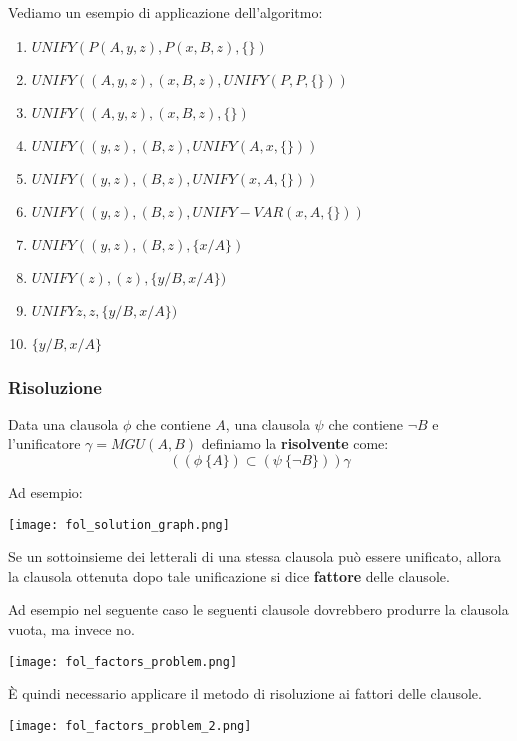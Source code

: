\begin{example}
	Vediamo un esempio di applicazione dell'algoritmo:
	\begin{enumerate}
		\item $UNIFY(P(A,y,z),P(x,B,z), \{\})$
		\item $UNIFY((A,y,z),(x,B,z), UNIFY(P,P,\{\}))$
		\item $UNIFY((A,y,z),(x,B,z),\{\})$
		\item $UNIFY((y,z),(B,z), UNIFY(A,x,\{\}))$
		\item $UNIFY((y,z),(B,z), UNIFY(x,A,\{\}))$
		\item $UNIFY((y,z),(B,z), UNIFY-VAR(x,A,\{\}))$
		\item $UNIFY((y,z),(B,z), \{x/A\})$
		\item $UNIFY(z),(z), \{y/B, x/A\})$
		\item $UNIFYz,z, \{y/B, x/A\})$
		\item $\{y/B, x/A\}$
	\end{enumerate}
\end{example}

\subsubsection{Risoluzione}
Data una clausola $\phi$ che contiene $A$, una clausola $\psi$ che contiene $\neg B$ e l'unificatore $\gamma=MGU(A,B)$ definiamo la \textbf{risolvente} come:
\begin{equation}
	((\phi \ \{A\}) \subset (\psi \ \{\neg B\}))\gamma
\end{equation}
\begin{example}
	Ad esempio:
	\begin{center}
		\texttt{[image: fol\_solution\_graph.png]}
	\end{center}
\end{example}

\begin{definition}[Fattori]
	Se un sottoinsieme dei letterali di una stessa clausola può essere unificato, allora la clausola ottenuta dopo tale unificazione si dice \textbf{fattore} delle clausole.
\end{definition}

\begin{observation}
	Ad esempio nel seguente caso le seguenti clausole dovrebbero produrre la clausola vuota, ma invece no.
	\begin{center}
		\texttt{[image: fol\_factors\_problem.png]}
	\end{center}
	È quindi necessario applicare il metodo di risoluzione ai fattori delle clausole.
	\begin{center}
		\texttt{[image: fol\_factors\_problem\_2.png]}
	\end{center}
\end{observation}

